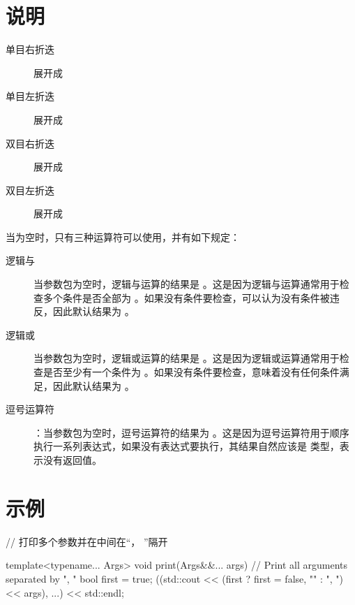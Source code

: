 \section{说明}
\noindent
\begin{description}
	\item[单目右折迭] 展开成
	\item[单目左折迭] 展开成
	\item[双目右折迭] 展开成
	\item[双目左折迭] 展开成
\end{description}

当为空时，只有三种运算符可以使用，并有如下规定：
\begin{description}

	\item[逻辑与\cppinline{&&}]当参数包为空时，逻辑与运算的结果是
	      。这是因为逻辑与运算通常用于检查多个条件是否全部为
	      。如果没有条件要检查，可以认为没有条件被违反，因此默认结果为 。

	\item[逻辑或\cppinline{||}]当参数包为空时，逻辑或运算的结果是
	      。这是因为逻辑或运算通常用于检查是否至少有一个条件为
	      。如果没有条件要检查，意味着没有任何条件满足，因此默认结果为 。

	\item[逗号运算符]：当参数包为空时，逗号运算符的结果为
	      。这是因为逗号运算符用于顺序执行一系列表达式，如果没有表达式要执行，其结果自然应该是
	       类型，表示没有返回值。
\end{description}

\section{示例}
\begin{cpplst}
// 打印多个参数并在中间在“， ”隔开

template<typename... Args>
void print(Args&&... args)
{
	// Print all arguments separated by ", "
	bool first = true;
	((std::cout << (first ? first = false, "" : ", ") << args), ...) << std::endl;
}
\end{cpplst}

